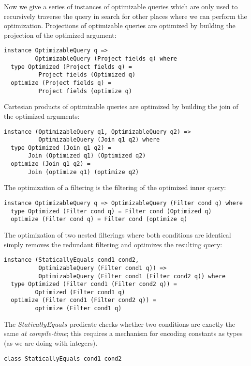 Now we give a series of instances of optimizable queries which are only used to recursively traverse the query in search for other places where we can perform the optimization. Projections of optimizable queries are optimized by building the projection of the optimized argument:
\begin{lstlisting}
instance OptimizableQuery q => 
         OptimizableQuery (Project fields q) where
  type Optimized (Project fields q) = 
          Project fields (Optimized q)
  optimize (Project fields q) = 
          Project fields (optimize q)
\end{lstlisting}

Cartesian products of optimizable queries are optimized by building the join of the optimized arguments:
\begin{lstlisting}
instance (OptimizableQuery q1, OptimizableQuery q2) => 
          OptimizableQuery (Join q1 q2) where
  type Optimized (Join q1 q2) = 
       Join (Optimized q1) (Optimized q2)
  optimize (Join q1 q2) = 
       Join (optimize q1) (optimize q2)
\end{lstlisting}

The optimization of a filtering is the filtering of the optimized inner query:
\begin{lstlisting}
instance OptimizableQuery q => OptimizableQuery (Filter cond q) where
  type Optimized (Filter cond q) = Filter cond (Optimized q)
  optimize (Filter cond q) = Filter cond (optimize q)
\end{lstlisting}

The optimization of two nested filterings where both conditions are identical simply removes the redundant filtering and optimizes the resulting query:
\begin{lstlisting}
instance (StaticallyEquals cond1 cond2, 
          OptimizableQuery (Filter cond1 q)) => 
          OptimizableQuery (Filter cond1 (Filter cond2 q)) where
  type Optimized (Filter cond1 (Filter cond2 q)) = 
         Optimized (Filter cond1 q)
  optimize (Filter cond1 (Filter cond2 q)) = 
         optimize (Filter cond1 q)
\end{lstlisting}

The $StaticallyEquals$ predicate checks whether two conditions are exactly the same \textit{at compile-time}; this requires a mechanism for encoding constants as types (as we are doing with integers).

\begin{lstlisting}
class StaticallyEquals cond1 cond2
\end{lstlisting}


